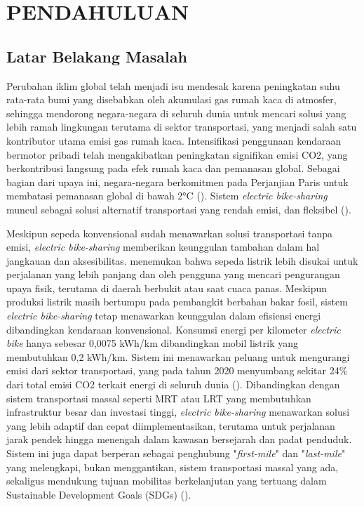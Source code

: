 \chapter{PENDAHULUAN}
\setcounter{page}{1}

\section{Latar Belakang Masalah}

Perubahan iklim global telah menjadi isu mendesak karena peningkatan suhu rata-rata bumi yang disebabkan oleh akumulasi gas rumah kaca di atmosfer, sehingga mendorong negara-negara di seluruh dunia untuk mencari solusi yang lebih ramah lingkungan terutama di sektor transportasi, yang menjadi salah satu kontributor utama emisi gas rumah kaca. Intensifikasi penggunaan kendaraan bermotor pribadi telah mengakibatkan peningkatan signifikan emisi CO2, yang berkontribusi langsung pada efek rumah kaca dan pemanasan global. Sebagai bagian dari upaya ini, negara-negara berkomitmen pada Perjanjian Paris untuk membatasi pemanasan global di bawah 2°C (). Sistem \textit{electric bike-sharing} muncul sebagai solusi alternatif transportasi yang rendah emisi, dan fleksibel ().

Meskipun sepeda konvensional sudah menawarkan solusi transportasi tanpa emisi, \textit{electric bike-sharing} memberikan keunggulan tambahan dalam hal jangkauan dan aksesibilitas.  menemukan bahwa sepeda listrik lebih disukai untuk perjalanan yang lebih panjang dan oleh pengguna yang mencari pengurangan upaya fisik, terutama di daerah berbukit atau saat cuaca panas. Meskipun produksi listrik masih bertumpu pada pembangkit berbahan bakar fosil, sistem \textit{electric bike-sharing} tetap menawarkan keunggulan dalam efisiensi energi dibandingkan kendaraan konvensional. Konsumsi energi per kilometer \textit{electric bike} hanya sebesar 0,0075 kWh/km dibandingkan mobil listrik yang membutuhkan 0,2 kWh/km. Sistem ini menawarkan peluang untuk mengurangi emisi dari sektor transportasi, yang pada tahun 2020 menyumbang sekitar 24\% dari total emisi CO2 terkait energi di seluruh dunia (). Dibandingkan dengan sistem transportasi massal seperti MRT atau LRT yang membutuhkan infrastruktur besar dan investasi tinggi, \textit{electric bike-sharing} menawarkan solusi yang lebih adaptif dan cepat diimplementasikan, terutama untuk perjalanan jarak pendek hingga menengah dalam kawasan bersejarah dan padat penduduk. Sistem ini juga dapat berperan sebagai penghubung "\textit{first-mile}" dan "\textit{last-mile}" yang melengkapi, bukan menggantikan, sistem transportasi massal yang ada, sekaligus mendukung tujuan mobilitas berkelanjutan yang tertuang dalam Sustainable Development Goals (SDGs) ().

